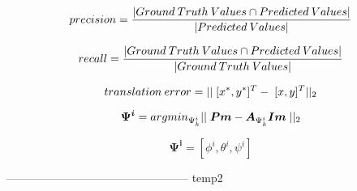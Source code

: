 \documentclass{beamer}
\begin{document}
\\\\\\\\\
\begin{equation}
 precision = \frac{| {Ground\hspace{0.08cm}Truth\hspace{0.08cm}Values} \cap {Predicted\hspace{0.08cm}Values} |}{ | {Predicted\hspace{0.08cm}Values} |}
\end{equation}

\begin{equation}
 recall = \frac{| {Ground\hspace{0.08cm}Truth\hspace{0.08cm}Values} \cap {Predicted\hspace{0.08cm}Values} |}{ | {Ground\hspace{0.08cm}Truth\hspace{0.08cm}Values} |}
\end{equation}

\begin{equation}
 translation\hspace{0.08cm}error = ||\hspace{0.1cm}[x^*,y^*]^T - \hspace{0.1cm}[x,y]^T  ||_2
\end{equation}

\begin{equation}
 \boldsymbol{\Psi^i} = argmin_{\Psi^{i}_{k}} || \hspace{0.1cm} \boldsymbol{Pm}  - \boldsymbol{
 A}_{\Psi^{i}_{k}}\boldsymbol{Im} \hspace{0.1cm}||_2
\end{equation}

\begin{equation}
\boldsymbol{\Psi^i} = [\phi^i, \theta^i, \psi^i]
\end{equation}

------------------------------------------------
{temp2}
\end{document}
